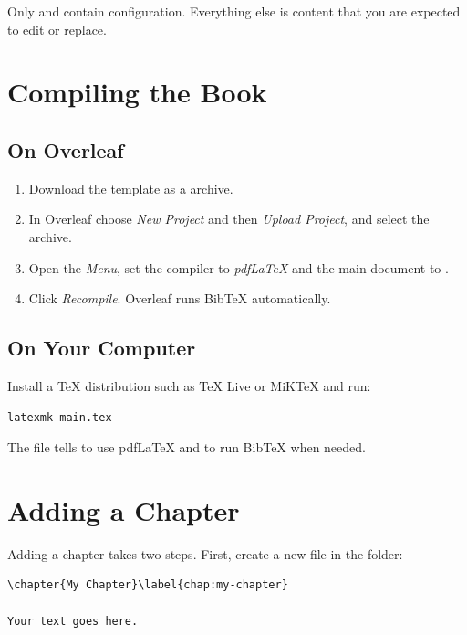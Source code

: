 \begin{note}
Only  and  contain configuration.
Everything else is content that you are expected to edit or replace.
\end{note}

\section{Compiling the Book}\label{sec:compiling}

\subsection{On Overleaf}

\begin{enumerate}
  \item Download the template as a  archive.
  \item In Overleaf choose \emph{New Project} and then \emph{Upload Project},
        and select the archive.
  \item Open the \emph{Menu}, set the compiler to \emph{pdfLaTeX} and the main
        document to .
  \item Click \emph{Recompile}. Overleaf runs BibTeX automatically.
\end{enumerate}

\subsection{On Your Computer}

Install a \TeX{} distribution such as \TeX{} Live or MiKTeX and run:

\begin{lstlisting}[language={}]
latexmk main.tex
\end{lstlisting}

\noindent The file  tells  to use pdfLaTeX and to
run BibTeX when needed.

\section{Adding a Chapter}\label{sec:adding-chapter}

Adding a chapter takes two steps. First, create a new file in the
 folder:

\begin{lstlisting}[language={[LaTeX]TeX}]
% chapters/05-my-chapter.tex
\chapter{My Chapter}\label{chap:my-chapter}

Your text goes here.
\end{lstlisting}

